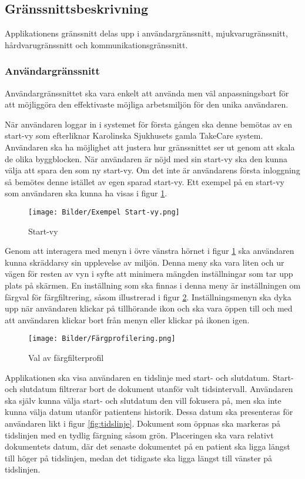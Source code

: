 \documentclass{article}
\begin{document}
\newpage
\subsection{Gränssnittsbeskrivning}
Applikationens gränssnitt delas upp i användargränssnitt, mjukvarugränssnitt, hårdvarugränssnitt och kommunikationsgränssnitt. 
\subsubsection{Användargränssnitt}
Användargränssnittet ska vara enkelt att använda men väl anpassningsbart för att möjliggöra den effektivaste möjliga arbetsmiljön för den unika användaren. 

När användaren loggar in i systemet för första gången ska denne bemötas av en start-vy som efterliknar Karolinska Sjukhusets gamla TakeCare system. Användaren ska ha möjlighet att justera hur gränssnittet ser ut genom att skala de olika byggblocken. När användaren är nöjd med sin start-vy ska den kunna välja att spara den som ny start-vy. Om det inte är användarens första inloggning så bemötes denne istället av egen sparad start-vy. Ett exempel på en start-vy som användaren ska kunna ha visas i figur \ref{fig:start-vy}.

\begin{figure}[H]
    \centering
    \texttt{[image: Bilder/Exempel Start-vy.png]}
    \caption{Start-vy}
    \label{fig:start-vy}
\end{figure}

Genom att interagera med menyn i övre vänstra hörnet i figur \ref{fig:start-vy} ska användaren kunna skräddarsy sin upplevelse av miljön. Denna meny ska vara liten och ur vägen för resten av vyn i syfte att minimera mängden inställningar som tar upp plats på skärmen. En inställning som ska finnas i denna meny är inställningen om färgval för färgfiltrering, såsom illustrerad i figur \ref{fig:färgfilterprofil}. Inställningsmenyn ska dyka upp när användaren klickar på tillhörande ikon och ska vara öppen till och med att användaren klickar bort från menyn eller klickar på ikonen igen. 

\begin{figure}[H]
    \centering
    \texttt{[image: Bilder/Färgprofilering.png]}
    \caption{Val av färgfilterprofil}
    \label{fig:färgfilterprofil}
\end{figure}

Applikationen ska visa användaren en tidslinje med start- och slutdatum. Start- och slutdatum filtrerar bort de dokument utanför valt tidsintervall. Användaren ska själv kunna välja start- och slutdatum den vill fokusera på, men ska inte kunna välja datum utanför patientens historik. Dessa datum ska presenteras för användaren likt i figur \ref{fig:tidslinje}. Dokument som öppnas ska markeras på tidslinjen med en tydlig färgning såsom grön. Placeringen ska vara relativt dokumentets datum, där det senaste dokumentet på en patient ska ligga längst till höger på tidslinjen, medan det tidigaste ska ligga längst till vänster på tidslinjen.
\end{document}
